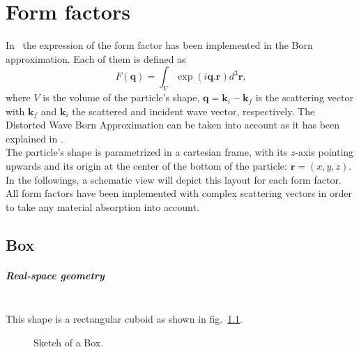 \chapter{Form factors} \label{appendixff}
\hypertarget{formfactors}{}
In \BornAgain\ the expression of the form factor has been implemented in the Born approximation. Each of them is defined as
\begin{equation*}
F(\mathbf{q})=\int_V \exp (i\mathbf{q}.\mathbf{r}) d^3 \mathbf{r},
\end{equation*}
where $V$ is the volume of the particle's shape,
$\mathbf{q}=\mathbf{k}_i - \mathbf{k}_f$ is the scattering vector with
$\mathbf{k}_f$ and $\mathbf{k}_i$ the scattered and incident wave
vector, respectively. The Distorted Wave Born Approximation can be taken into account as it has been explained in .\\

The particle's shape is parametrized in a cartesian frame, with its
$z$-axis pointing upwards and its origin at the center of the bottom
of the particle: $\mathbf{r}=(x,y,z)$. In the followings, a schematic view will depict this layout for each
form factor.\\


All form factors have been implemented with complex scattering vectors
in order to take any material absorption into account.\\

\newpage
\section{Box}  

\paragraph{Real-space geometry}\mbox{}\\
This shape is a rectangular cuboid as
shown in fig.~\ref{fig:box}. 

\begin{figure}[ht]
\hfill
{}
\hfill
{}
\hfill
\caption{Sketch of a Box.}
\label{fig:box}
\end{figure}

